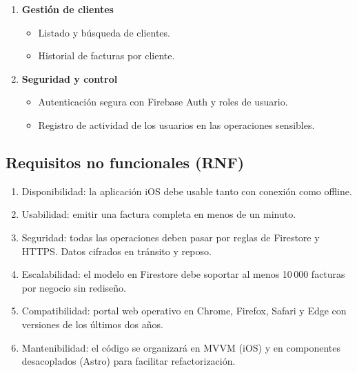 \begin{large}
\begin{enumerate}[label=\textbf{RF\arabic*.}]
  \item \textbf{Gestión de clientes}
        \begin{itemize}
          \item Listado y búsqueda de clientes.
          \item Historial de facturas por cliente.
        \end{itemize}

  \item \textbf{Seguridad y control}
        \begin{itemize}
          \item Autenticación segura con Firebase Auth y roles de usuario.
          \item Registro de actividad de los usuarios en las operaciones sensibles.
        \end{itemize}
\end{enumerate}

\end{large}

\subsection*{Requisitos no funcionales (RNF)}

\begin{large}

\begin{enumerate}[label=\textbf{RNF\arabic*.}]
   \item Disponibilidad: la aplicación iOS debe usable tanto con conexión como offline.
  \item Usabilidad: emitir una factura completa en menos de un minuto.
  \item Seguridad: todas las operaciones deben pasar por reglas de Firestore y HTTPS. Datos cifrados en tránsito y reposo.
  \item Escalabilidad: el modelo en Firestore debe soportar al menos 10\,000 facturas por negocio sin rediseño.
  \item Compatibilidad: portal web operativo en Chrome, Firefox, Safari y Edge con versiones de los últimos dos años.
  \item Mantenibilidad: el código se organizará en MVVM (iOS) y en componentes desacoplados (Astro) para facilitar refactorización.
\end{enumerate}

\end{large}

